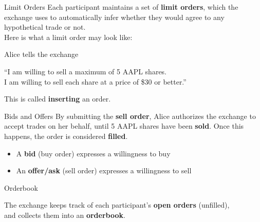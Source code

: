 \begin{frame}{Limit Orders}
  Each participant maintains a set of \textbf{limit orders}, which the exchange uses 
  to automatically infer whether they would agree to any hypothetical trade or not.\\
  Here is what a limit order may look like:
  \begin{sqt:tip}
    Alice tells the exchange
    \begin{center}
      ``I am willing to sell a maximum of 5 AAPL shares.\\
      I am willing to sell each share at a price of \$30 or better.''
    \end{center}
  \end{sqt:tip}

  This is called \textbf{inserting} an order.

  \begin{center}
    
  \end{center}
\end{frame}

\begin{frame}{Bids and Offers}
  By submitting the \textbf{sell order}, Alice authorizes the exchange to accept trades on her behalf, 
  until 5 AAPL shares have been \textbf{sold}. Once this happens, the order is considered \textbf{filled}.

  \begin{sqt:definition}
    \begin{itemize}
      \item A \textbf{bid} (buy order) expresses a willingness to buy
      \item An \textbf{offer/ask} (sell order) expresses a willingness to sell
    \end{itemize}
  \end{sqt:definition}

  \begin{center}
    
  \end{center}
\end{frame}

\begin{frame}{Orderbook}
  \begin{sqt:definition}
    The exchange keeps track of each participant's \textbf{open orders} (unfilled),\\
    and collects them into an \textbf{orderbook}.
  \end{sqt:definition}

  \begin{center}
    
  \end{center}
\end{frame}

